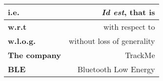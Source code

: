 \renewcommand{\arraystretch}{1.5}
\begin{center}
    \begin{tabular}{|l|r|}
        \hline
        \textbf{i.e.} & \textit{Id est}, that is  \\
        \hline
        \textbf{w.r.t} & with respect to  \\
        \hline
        \textbf{w.l.o.g.} & without loss of generality \\
        \hline
        \textbf{The company} & TrackMe \\
        \hline
        \textbf{BLE} & Bluetooth Low Energy \\
        \hline
    \end{tabular}
\end{center}